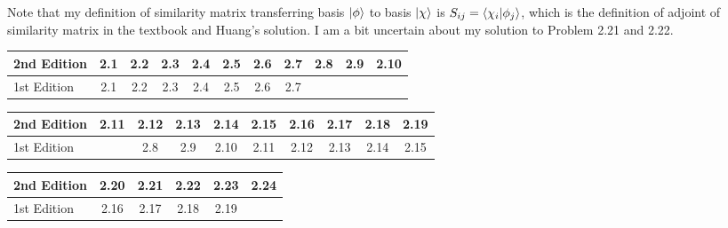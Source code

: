 \documentclass{article}
\begin{document}
    Note that my definition of similarity matrix transferring basis $\ket{\phi}$ to basis $\ket{\chi}$ is $S_{ij}=\braket{\chi_i}{\phi_j}$, which is the definition of adjoint of similarity matrix in the textbook and Huang's solution. I am a bit uncertain about my solution to Problem 2.21 and 2.22.
\begin{table}[h!]
    \begin{center}
      \begin{tabular}{l|c|c|c|c|c|c|c|c|c|c} 
        \hline
        2nd Edition
        &2.1
        &2.2
        &2.3
        &2.4
        &2.5
        &2.6
        &2.7
        &2.8
        &2.9
        &2.10
        \\ \hline
        1st Edition
        &2.1
        &2.2
        &2.3
        &2.4
        &2.5
        &2.6
        &2.7
        &
        &
        &
        \\ \hline
      \end{tabular}
    \end{center}
\end{table}
\begin{table}[h!]
    \begin{center}
      \begin{tabular}{l|c|c|c|c|c|c|c|c|c} 
        \hline
        2nd Edition
        &2.11
        &2.12
        &2.13
        &2.14
        &2.15
        &2.16
        &2.17
        &2.18
        &2.19
        \\ \hline
        1st Edition
        &        
        &2.8
        &2.9
        &2.10
        &2.11
        &2.12
        &2.13
        &2.14
        &2.15
        \\ \hline
      \end{tabular}
    \end{center}
  \end{table}

\begin{table}[h!]
  \begin{center}
    \begin{tabular}{l|c|c|c|c|c}
      \hline
      2nd Edition
      &2.20
      &2.21
      &2.22
      &2.23
      &2.24
      \\ \hline
      1st Edition
      &2.16
      &2.17
      &2.18
      &2.19
      &
    \end{tabular}
  \end{center}
\end{table}
\end{document}
